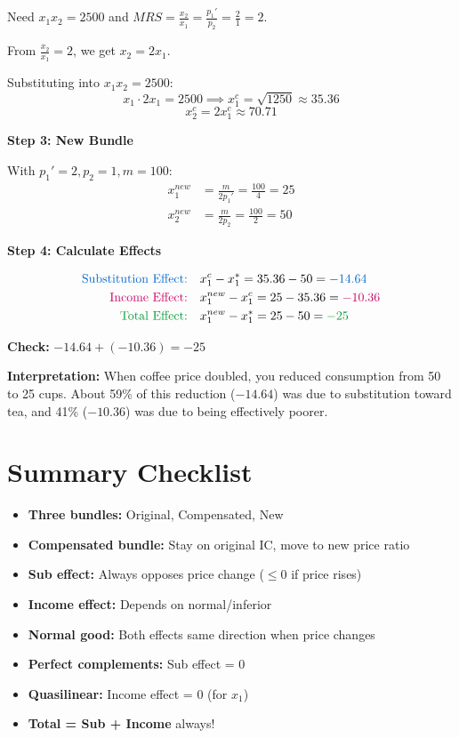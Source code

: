 \documentclass[12pt]{article}
\begin{document}
Need $x_1 x_2 = 2500$ and $MRS = \frac{x_2}{x_1} = \frac{p_1'}{p_2} = \frac{2}{1} = 2$.

From $\frac{x_2}{x_1} = 2$, we get $x_2 = 2x_1$.

Substituting into $x_1 x_2 = 2500$:
\[x_1 \cdot 2x_1 = 2500 \implies x_1^c = \sqrt{1250} \approx 35.36\]
\[x_2^c = 2x_1^c \approx 70.71\]

\textbf{Step 3: New Bundle}

With $p_1' = 2, p_2 = 1, m = 100$:
\begin{align*}
x_1^{new} &= \frac{m}{2p_1'} = \frac{100}{4} = 25 \\
x_2^{new} &= \frac{m}{2p_2} = \frac{100}{2} = 50
\end{align*}

\textbf{Step 4: Calculate Effects}

\begin{align*}
\text{\textcolor{subcolor}{Substitution Effect:}} \quad & x_1^c - x_1^* = 35.36 - 50 = \textcolor{subcolor}{-14.64} \\
\text{\textcolor{incomecolor}{Income Effect:}} \quad & x_1^{new} - x_1^c = 25 - 35.36 = \textcolor{incomecolor}{-10.36} \\
\text{\textcolor{totalcolor}{Total Effect:}} \quad & x_1^{new} - x_1^* = 25 - 50 = \textcolor{totalcolor}{-25}
\end{align*}

\textbf{Check:} $-14.64 + (-10.36) = -25$ \checkmark

\textbf{Interpretation:} When coffee price doubled, you reduced consumption from 50 to 25 cups. About 59\% of this reduction ($-14.64$) was due to substitution toward tea, and 41\% ($-10.36$) was due to being effectively poorer.

\section{Summary Checklist}

\begin{tcolorbox}[colback=green!5!white,colframe=green!50!black,title=Quick Reference]
\begin{itemize}[leftmargin=*]
\item \textbf{Three bundles:} Original, Compensated, New
\item \textbf{Compensated bundle:} Stay on original IC, move to new price ratio
\item \textbf{Sub effect:} Always opposes price change ($\leq 0$ if price rises)
\item \textbf{Income effect:} Depends on normal/inferior
\item \textbf{Normal good:} Both effects same direction when price changes
\item \textbf{Perfect complements:} Sub effect = 0
\item \textbf{Quasilinear:} Income effect = 0 (for $x_1$)
\item \textbf{Total = Sub + Income} always!
\end{itemize}
\end{tcolorbox}
\end{document}
